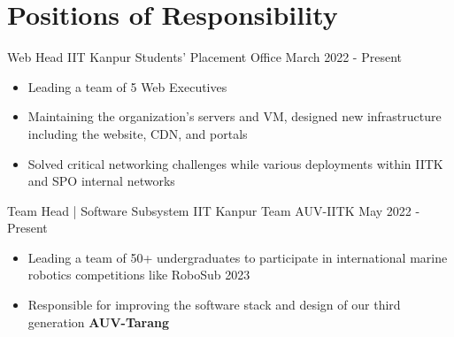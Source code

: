 \section*{\sc Positions of Responsibility}
\vspace{-2mm}
\hrulefill
\vspace{1mm}

\cventry
{Web Head} %
{IIT Kanpur} %
{Students' Placement Office} %
{March 2022 - Present} %
{
  \begin{itemize} %
    \item Leading a team of 5 Web Executives 
    \item Maintaining the organization’s servers and VM, designed new infrastructure including the website, CDN, and portals
    \item Solved critical networking challenges while various deployments within IITK and SPO internal networks
  \end{itemize}
}

\cventry
{Team Head | Software Subsystem} %
{IIT Kanpur} %
{Team AUV-IITK} %
{May 2022 - Present} %
{
  \begin{itemize} %
    \item Leading a team of 50+ undergraduates to participate in international marine robotics competitions like RoboSub 2023 
    \item Responsible for improving the software stack and design of our third generation \textbf{AUV-Tarang}
  \end{itemize}
}

